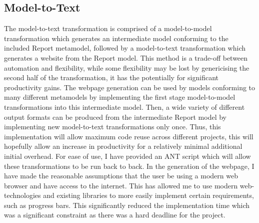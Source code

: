 \documentclass{article}
\begin{document}
\subsection{Model-to-Text}
\label{model-to-text}

The model-to-text transformation is comprised of a model-to-model transformation which generates an intermediate model conforming to the included Report metamodel, followed by a model-to-text transformation which generates a website from the Report model. This method is a trade-off between automation and flexibility\cite{evolving_models}, while some flexibility may be lost by genericising the second half of the transformation, it has the potentially for significant productivity gains. The webpage generation can be used by models conforming to many different metamodels by implementing the first stage model-to-model transformations into this intermediate model. Then, a wide variety of different output formats can be produced from the intermediate Report model by implementing new model-to-text transformations only once. Thus, this implementation will allow maximum code reuse across different projects, this will hopefully allow an increase in productivity for a relatively minimal additional initial overhead. For ease of use, I have provided an ANT script which will allow these transformations to be run back to back. In the generation of the webpage, I have made the reasonable assumptions that the user be using a modern web browser and have access to the internet. This has allowed me to use modern web-technologies and existing libraries to more easily implement certain requirements, such as progress bars. This significantly reduced the implementation time which was a significant constraint as there was a hard deadline for the project.
\\\\
\end{document}
